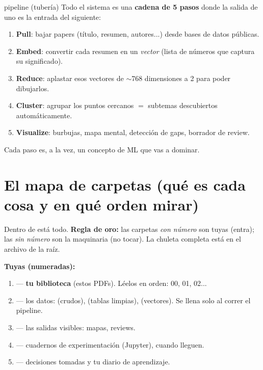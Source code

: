 \documentclass[11pt,a4paper]{article}
\begin{document}
\begin{concepto}{pipeline (tubería)}
Todo el sistema es una \textbf{cadena de 5 pasos} donde la salida de uno es la entrada
del siguiente:
\begin{center}
\end{center}
\begin{enumerate}
  \item \textbf{Pull}: bajar papers (título, resumen, autores...) desde bases de datos públicas.
  \item \textbf{Embed}: convertir cada resumen en un \emph{vector} (lista de números que captura su significado).
  \item \textbf{Reduce}: aplastar esos vectores de $\sim$768 dimensiones a 2 para poder dibujarlos.
  \item \textbf{Cluster}: agrupar los puntos cercanos $=$ subtemas descubiertos automáticamente.
  \item \textbf{Visualize}: burbujas, mapa mental, detección de gaps, borrador de review.
\end{enumerate}
Cada paso es, a la vez, un concepto de ML que vas a dominar.
\end{concepto}

\section{El mapa de carpetas (qué es cada cosa y en qué orden mirar)}

Dentro de  está todo.
\textbf{Regla de oro:} las carpetas \emph{con número} son tuyas (entra); las \emph{sin
número} son la maquinaria (no tocar). La chuleta completa está en el archivo
 de la raíz.

\textbf{Tuyas (numeradas):}
\begin{enumerate}
  \item {} --- \textbf{tu biblioteca} (estos PDFs). Léelos en orden: 00, 01, 02...
  \item {} --- los datos:  (crudos),  (tablas
        limpias),  (vectores). Se llena solo al correr el pipeline.
  \item {} --- las salidas visibles: mapas, reviews.
  \item {} --- cuadernos de experimentación (Jupyter), cuando lleguen.
  \item {} --- decisiones tomadas y tu diario de aprendizaje.
\end{enumerate}
\end{document}
